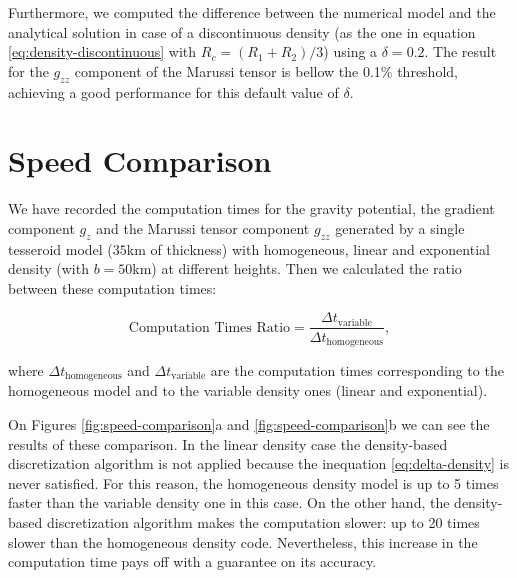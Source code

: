 \documentclass[extra]{gji}
\begin{document}
Furthermore, we computed the difference between the numerical model and the analytical solution in case of a discontinuous density (as the one in equation \ref{eq:density-discontinuous} with $R_c = (R_1 + R_2)/3$) using a $\delta = 0.2$.
The result for the $g_{zz}$ component of the Marussi tensor is bellow the 0.1\% threshold, achieving a good performance for this default value of $\delta$.



\section{Speed Comparison}

We have recorded the computation times for the gravity potential, the gradient component $g_z$ and the Marussi tensor component $g_{zz}$ generated by a single tesseroid model ($35$km of thickness) with homogeneous, linear and exponential density (with $b=50$km) at different heights. Then we calculated the ratio between these computation times:

\begin{equation}
    \text{Computation Times Ratio} =
        \frac{\Delta t_\text{variable}}{\Delta t_\text{homogeneous}},
    \label{eq:computation-times-ratio}
\end{equation}

\noindent where $\Delta t_\text{homogeneous}$ and $\Delta t_\text{variable}$ are the computation times corresponding to the homogeneous model and to the variable density ones (linear and exponential).

On Figures \ref{fig:speed-comparison}a and \ref{fig:speed-comparison}b we can see the results of these comparison.
In the linear density case the density-based discretization algorithm is not applied because the inequation \ref{eq:delta-density} is never satisfied.
For this reason, the homogeneous density model is up to 5 times faster than the variable density one in this case.
On the other hand, the density-based discretization algorithm makes the computation slower: up to 20 times slower than the homogeneous density code.
Nevertheless, this increase in the computation time pays off with a guarantee on its accuracy.
\end{document}
